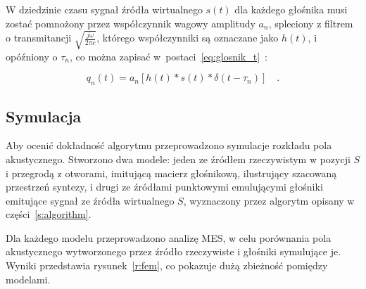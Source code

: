 \documentclass[10pt, a4paper]{article}
\let\Oldsubsection\subsection
\renewcommand{\subsection}{\FloatBarrier\Oldsubsection}
\begin{document}
W dziedzinie czasu sygnał źródła wirtualnego $s(t)$ dla każdego głośnika musi
zostać pomnożony przez współczynnik wagowy amplitudy $a_n$, spleciony z filtrem
o transmitancji $\sqrt{\frac{j\omega}{2\pi c}}$, którego współczynniki są
oznaczane jako $h(t)$, i opóźniony o $\tau_n$, co można zapisać
w~postaci~\eqref{eq:glosnik_t}~\cite{enhancement}:

\begin{equation}
  q_n(t) = a_n\left[h(t)*s(t)*\delta(t-\tau_n)\right] \quad. \label{eq:glosnik_t}
\end{equation}

\subsection{Symulacja}

Aby ocenić dokładność algorytmu przeprowadzono symulacje rozkładu pola
akustycznego.  Stworzono dwa modele: jeden ze źródłem rzeczywistym w pozycji
$S$ i przegrodą z otworami, imitującą macierz głośnikową, ilustrujący szacowaną
przestrzeń syntezy, i drugi ze źródłami punktowymi emulującymi głośniki
emitujące sygnał ze źródła wirtualnego $S$, wyznaczony przez algorytm opisany w
części~\ref{s:algorithm}.

Dla każdego modelu przeprowadzono analizę MES, w celu porównania pola
akustycznego wytworzonego przez źródło rzeczywiste i głośniki symulujące je.
Wyniki przedstawia rysunek~\ref{r:fem}, co pokazuje dużą zbieżność pomiędzy
modelami.
\end{document}
